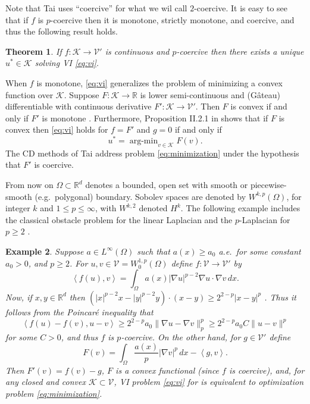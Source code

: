 \documentclass[letterpaper,final,12pt,reqno]{amsart}
\theoremstyle{cstyle}
\newtheorem{theorem}{Theorem}
\theoremstyle{cstyle*}
\theoremstyle{dstyle}
\newtheorem{example}[theorem]{Example}
\numberwithin{equation}{section}
\numberwithin{figure}{section}
\numberwithin{table}{section}
\numberwithin{theorem}{section}
\newcommand{\RR}{\mathbb{R}}
\newcommand{\grad}{\nabla}
\newcommand{\cK}{\mathcal{K}}
\newcommand{\cV}{\mathcal{V}}
\newcommand{\ip}[2]{\left<#1,#2\right>}
\begin{document}
Note that Tai \cite{Tai2003} uses ``coercive'' for what we wil call $2$-coercive.  It is easy to see that if $f$ is $p$-coercive then it is monotone, strictly monotone, and coercive, and thus the following result holds.

\begin{theorem}  \label{thm:viwellposed}  If $f:\cK \to \cV'$ is continuous and $p$-coercive then there exists a unique $u^*\in \cK$ solving VI \eqref{eq:vi}.
\end{theorem}

When $f$ is monotone, \eqref{eq:vi} generalizes the problem of minimizing a convex function over $\cK$.  Suppose $F:\cK \to \RR$ is lower semi-continuous and (G\^ateau) differentiable with continuous derivative $F':\cK \to \cV'$.  Then $F$ is convex if and only if $F'$ is monotone \cite[Proposition I.5.5]{EkelandTemam1976}.  Furthermore, Proposition II.2.1 in \cite{EkelandTemam1976} shows that if $F$ is convex then \eqref{eq:vi} holds for $f=F'$ and $g=0$ if and only if
\begin{equation}
u^* = \operatorname{arg-min}_{v\in\cK} F(v). \label{eq:minimization}
\end{equation}
The CD methods of Tai \cite{Tai2003} address problem \eqref{eq:minimization} under the hypothesis that $F'$ is coercive.

From now on $\Omega \subset \RR^d$ denotes a bounded, open set with smooth or piecewise-smooth (e.g.~polygonal) boundary.  Sobolev spaces \cite{Evans2010} are denoted by $W^{k,p}(\Omega)$, for integer $k$ and $1\le p \le \infty$, with $W^{k,2}$ denoted $H^k$.  The following example includes the classical obstacle problem for the linear Laplacian \cite{GraeserKornhuber2009} and the $p$-Laplacian for $p\ge 2$ \cite{ChoeLewis1991}.

\begin{example}  \label{ex:plaplacian}  Suppose $a\in L^\infty(\Omega)$ such that $a(x)\ge a_0$ a.e.~for some constant $a_0>0$, and $p\ge 2$.  For $u,v \in \cV = W^{1,p}_0(\Omega)$ define $f:\cV \to \cV'$ by
\begin{equation}
\ip{f(u)}{v} = \int_\Omega a(x) |\grad u|^{p-2} \grad u \cdot \grad v\,dx. \label{eq:plaplacian}
\end{equation}
Now, if $x,y\in\RR^d$ then $(|x|^{p-2} x - |y|^{p-2} y)\cdot (x-y) \ge 2^{2-p} |x-y|^p$ \cite[see Appendix A and references therein]{Bueler2021conservation}.  Thus it follows from the Poincar\'e inequality that
    $$\ip{f(u) - f(v)}{u-v} \ge 2^{2-p} a_0 \|\grad u - \grad v\|_p^p \ge 2^{2-p} a_0 C \|u-v\|^p$$
for some $C>0$, and thus $f$ is $p$-coercive.  On the other hand, for $g\in\cV'$ define
    $$F(v) = \int_\Omega \frac{a(x)}{p} |\grad v|^p\,dx - \ip{g}{v}.$$
Then $F'(v) = f(v) - g$, $F$ is a convex functional (since $f$ is coercive), and, for any closed and convex $\cK\subset \cV$, VI problem \eqref{eq:vi} for is equivalent to optimization problem \eqref{eq:minimization}.\end{example}
\end{document}
